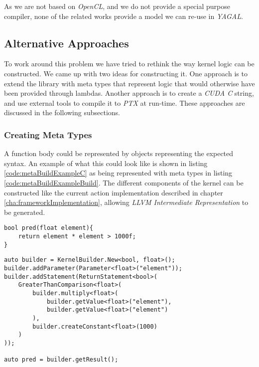 As we are not based on \textit{OpenCL}, and we do not provide a special purpose compiler, none of the related works provide a model we can re-use in \textit{YAGAL}.

\subsection{Alternative Approaches}
To work around this problem we have tried to rethink the way kernel logic can be constructed. We came up with two ideas for constructing it. One approach is to extend the library with meta types that represent logic that would otherwise have been provided through lambdas. Another approach is to create a \textit{CUDA C} string, and use external tools to compile it to \textit{PTX} at run-time. These approaches are discussed in the following subsections.

\subsubsection{Creating Meta Types}
A function body could be represented by objects representing the expected syntax. An example of what this could look like is shown in listing \ref{code:metaBuildExampleC} as being represented with meta types in listing \ref{code:metaBuildExampleBuild}. The different components of the kernel can be constructed like the current action implementation described in chapter \ref{cha:frameworkImplementation}, allowing \textit{LLVM Intermediate Representation} to be generated. 

\begin{lstlisting}[caption={Pseudo C code showing a kernel function.}, label={code:metaBuildExampleC}]
bool pred(float element){
    return element * element > 1000f;
}
\end{lstlisting}

\begin{lstlisting}[caption={Code showing how construction of kernel function in a meta type solution could be done.}, label={code:metaBuildExampleBuild}]
auto builder = KernelBuilder.New<bool, float>();
builder.addParameter(Parameter<float>("element"));
builder.addStatement(ReturnStatement<bool>(
    GreaterThanComparison<float>(
        builder.multiply<float>(
            builder.getValue<float>("element"), 
            builder.getValue<float>("element")
        ), 
        builder.createConstant<float>(1000)
    )
));

auto pred = builder.getResult();
\end{lstlisting}

